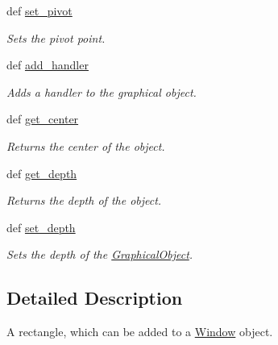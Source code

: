\begin{DoxyCompactItemize}
def \hyperlink{classcs110graphics_1_1Fillable_a2a6066d1a11c0854ff5ee85e7d9ceb54}{set\_\-pivot}
\begin{DoxyCompactList}\small\item\em Sets the pivot point. \item\end{DoxyCompactList}\item 
def \hyperlink{classcs110graphics_1_1GraphicalObject_adb1af0d5a6baae3f9a08d21a3227c49f}{add\_\-handler}
\begin{DoxyCompactList}\small\item\em Adds a handler to the graphical object. \item\end{DoxyCompactList}\item 
def \hyperlink{classcs110graphics_1_1GraphicalObject_a062789c4cc9de38af32dcc4ff2058607}{get\_\-center}
\begin{DoxyCompactList}\small\item\em Returns the center of the object. \item\end{DoxyCompactList}\item 
def \hyperlink{classcs110graphics_1_1GraphicalObject_a6d9f5718cd0cf249e0d2842971bae17f}{get\_\-depth}
\begin{DoxyCompactList}\small\item\em Returns the depth of the object. \item\end{DoxyCompactList}\item 
def \hyperlink{classcs110graphics_1_1GraphicalObject_a20d76d4ee4419c3065d61deb6cbc6700}{set\_\-depth}
\begin{DoxyCompactList}\small\item\em Sets the depth of the \hyperlink{classcs110graphics_1_1GraphicalObject}{GraphicalObject}. \item\end{DoxyCompactList}\end{DoxyCompactItemize}


\subsection{Detailed Description}
A rectangle, which can be added to a \hyperlink{classcs110graphics_1_1Window}{Window} object. 

